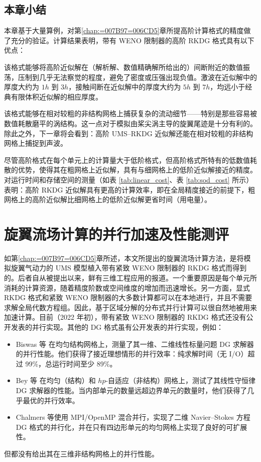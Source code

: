 \newpage{}

\section{本章小结}

本章基于大量算例，对第\ref{chap:=007B97=006CD5}章所提高阶计算格式的精度做了充分的验证。计算结果表明，带有
WENO 限制器的高阶 RKDG 格式具有以下优点：
\begin{description}[wide]
\item [{基本无振荡}] 该格式能够将高阶近似解在（解析解、数值精确解所给出的）间断附近的数值振荡，压制到几乎无法察觉的程度，避免了密度或压强出现负值。激波在近似解中的厚度大约为
$1h$ 到 $3h$，接触间断在近似解中的厚度大约为 $5h$ 到 $7h$，均远小于经典有限体积近似解的相应厚度。
\item [{数值耗散低}] 该格式能够在相对较粗的非结构网格上捕获复杂的流动细节——特别是那些容易被数值耗散磨平的涡结构。这一点对于模拟由桨尖涡主导的旋翼尾迹是十分有利的。除此之外，下一章将会看到：高阶
UMS–RKDG 近似解还能在相对较粗的非结构网格上捕捉到声波。
\item [{计算效率高}] 尽管高阶格式在每个单元上的计算量大于低阶格式，但高阶格式所特有的低数值耗散的优势，使得其在粗网格上近似解，具有与细网格上的低阶近似解接近的精度。对运行时间和存储空间的测量（如表
\ref{tab:linear_cost}、表 \ref{tab:sod_cost} 所示）表明：高阶 RKDG 近似解具有更高的计算效率，即在全局精度接近的前提下，粗网格上的高阶近似解比细网格上的低阶近似解更省时间（用电量）。
\end{description}


\chapter{旋翼流场计算的并行加速及性能测评\label{chap:=005E76=00884C}}

如第\ref{chap:=007B97=006CD5}章所述，本文所提出的旋翼流场计算方法，是将模拟旋翼气动力的 UMS 模型植入带有紧致
WENO 限制器的 RKDG 格式而得到的。后者自从被提出以来，鲜有三维工程应用的报道。一个重要原因是每个单元所消耗的计算资源，随着精度阶数或空间维度的增加而迅速增长。另一方面，显式
RKDG 格式和紧致 WENO 限制器的大多数计算都可以在本地进行，并且不需要求解全局代数方程组。因此，基于区域分解的分布式并行计算可以很自然地被用来加速计算。目前（2022
年初），带有紧致 WENO 限制器的 RKDG 格式还没有公开发表的并行实现。其他的 DG 格式虽有公开发表的并行实现，例如：
\begin{itemize}
\item Biswas 等 在均匀结构网格上，测量了其一维、二维线性标量问题 DG 求解器的并行性能。他们获得了接近理想情形的并行效率：纯求解时间（无
I/O）超过 99\%，总运行时间至少 89\%。
\item Bey 等 在均匀（结构）和 $hp$-自适应（非结构）网格上，测试了其线性守恒律 DG 求解器的性能。当内部单元的数量远超边界单元的数量时，他们获得了几乎最优的并行效率。
\item Chalmers 等使用 MPI/OpenMP 混合并行，实现了二维 Navier–Stokes
方程 DG 格式的并行化，并在只有四边形单元的均匀网格上实现了良好的可扩展性。
\end{itemize}
但都没有给出其在三维非结构网格上的并行性能。

